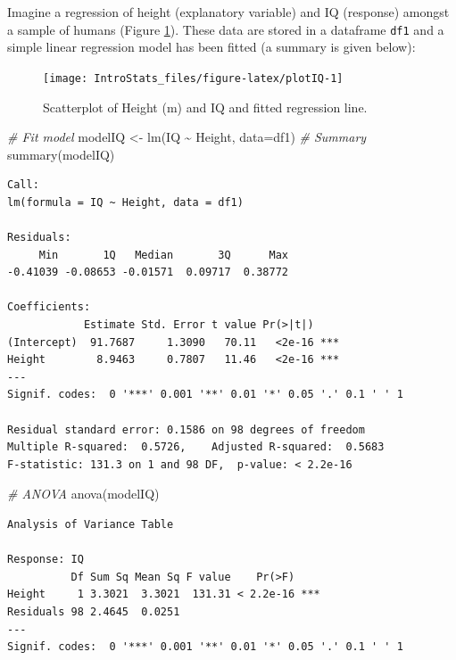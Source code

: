 \documentclass[
  oneside]{krantz}
\newenvironment{Shaded}{\begin{snugshade}}{\end{snugshade}}
\newcommand{\AttributeTok}[1]{\textcolor[rgb]{0.77,0.63,0.00}{#1}}
\newcommand{\CommentTok}[1]{\textcolor[rgb]{0.56,0.35,0.01}{\textit{#1}}}
\newcommand{\FunctionTok}[1]{\textcolor[rgb]{0.00,0.00,0.00}{#1}}
\newcommand{\NormalTok}[1]{#1}
\newcommand{\OtherTok}[1]{\textcolor[rgb]{0.56,0.35,0.01}{#1}}
\newcommand{\SpecialCharTok}[1]{\textcolor[rgb]{0.00,0.00,0.00}{#1}}
\begin{document}
Imagine a regression of height (explanatory variable) and IQ (response) amongst a sample of humans (Figure \ref{fig:plotIQ}). These data are stored in a dataframe \texttt{df1} and a simple linear regression model has been fitted (a summary is given below):

\begin{figure}

{\centering \texttt{[image: IntroStats\_files/figure-latex/plotIQ-1]} 

}

\caption{Scatterplot of Height (m) and IQ and fitted regression line.}\label{fig:plotIQ}
\end{figure}

\begin{Shaded}
\begin{Highlighting}[]
\CommentTok{\# Fit model}
\NormalTok{modelIQ }\OtherTok{\textless{}{-}} \FunctionTok{lm}\NormalTok{(IQ }\SpecialCharTok{\textasciitilde{}}\NormalTok{ Height, }\AttributeTok{data=}\NormalTok{df1) }
\CommentTok{\# Summary}
\FunctionTok{summary}\NormalTok{(modelIQ)}
\end{Highlighting}
\end{Shaded}

\begin{verbatim}
Call:
lm(formula = IQ ~ Height, data = df1)

Residuals:
     Min       1Q   Median       3Q      Max 
-0.41039 -0.08653 -0.01571  0.09717  0.38772 

Coefficients:
            Estimate Std. Error t value Pr(>|t|)    
(Intercept)  91.7687     1.3090   70.11   <2e-16 ***
Height        8.9463     0.7807   11.46   <2e-16 ***
---
Signif. codes:  0 '***' 0.001 '**' 0.01 '*' 0.05 '.' 0.1 ' ' 1

Residual standard error: 0.1586 on 98 degrees of freedom
Multiple R-squared:  0.5726,    Adjusted R-squared:  0.5683 
F-statistic: 131.3 on 1 and 98 DF,  p-value: < 2.2e-16
\end{verbatim}

\begin{Shaded}
\begin{Highlighting}[]
\CommentTok{\# ANOVA }
\FunctionTok{anova}\NormalTok{(modelIQ)}
\end{Highlighting}
\end{Shaded}

\begin{verbatim}
Analysis of Variance Table

Response: IQ
          Df Sum Sq Mean Sq F value    Pr(>F)    
Height     1 3.3021  3.3021  131.31 < 2.2e-16 ***
Residuals 98 2.4645  0.0251                      
---
Signif. codes:  0 '***' 0.001 '**' 0.01 '*' 0.05 '.' 0.1 ' ' 1
\end{verbatim}
\end{document}
